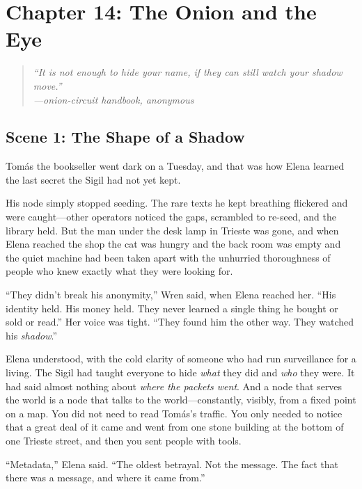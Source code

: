 \hypertarget{chapter-14-the-onion-and-the-eye}{%
\section{Chapter 14: The Onion and the
Eye}\label{chapter-14-the-onion-and-the-eye}}

\begin{quote}
\itshape ``It is not enough to hide your name, if they can still watch your shadow
move.''\\
\normalfont\hfill---onion-circuit handbook, anonymous
\end{quote}

\hypertarget{scene-1-the-shape-of-a-shadow}{%
\subsection{Scene 1: The Shape of a
Shadow}\label{scene-1-the-shape-of-a-shadow}}

Tomás the bookseller went dark on a Tuesday, and that was how Elena learned the
last secret the Sigil had not yet kept.

His node simply stopped seeding. The rare texts he kept breathing flickered and
were caught---other operators noticed the gaps, scrambled to re-seed, and the
library held. But the man under the desk lamp in Trieste was gone, and when Elena
reached the shop the cat was hungry and the back room was empty and the quiet
machine had been taken apart with the unhurried thoroughness of people who knew
exactly what they were looking for.

``They didn't break his anonymity,'' Wren said, when Elena reached her. ``His
identity held. His money held. They never learned a single thing he bought or
sold or read.'' Her voice was tight. ``They found him the other way. They watched
his \emph{shadow}.''

Elena understood, with the cold clarity of someone who had run surveillance for a
living. The Sigil had taught everyone to hide \emph{what} they did and \emph{who}
they were. It had said almost nothing about \emph{where the packets went}. And a
node that serves the world is a node that talks to the world---constantly,
visibly, from a fixed point on a map. You did not need to read Tomás's traffic.
You only needed to notice that a great deal of it came and went from one stone
building at the bottom of one Trieste street, and then you sent people with tools.

``Metadata,'' Elena said. ``The oldest betrayal. Not the message. The fact that
there was a message, and where it came from.''

